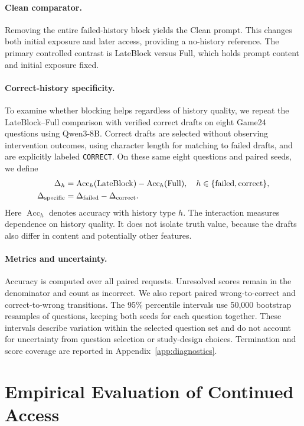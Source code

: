 \documentclass{article}
\newcommand{\fullaccess}{\ifmmode\mathrm{Full}\else\textup{Full}\fi}
\newcommand{\lateblock}{\ifmmode\mathrm{LateBlock}\else\textup{LateBlock}\fi}
\newcommand{\clean}{\ifmmode\mathrm{Clean}\else\textup{Clean}\fi}
\begin{document}
\paragraph{Clean comparator.}
Removing the entire failed-history block yields the \clean{} prompt. This changes both initial exposure and later access, providing a no-history reference. The primary controlled contrast is \lateblock{} versus \fullaccess{}, which holds prompt content and initial exposure fixed.

\paragraph{Correct-history specificity.}
To examine whether blocking helps regardless of history quality, we repeat the \lateblock{}--\fullaccess{} comparison with verified correct drafts on eight Game24 questions using Qwen3-8B. Correct drafts are selected without observing intervention outcomes, using character length for matching to failed drafts, and are explicitly labeled \texttt{CORRECT}. On these same eight questions and paired seeds, we define
\begin{align}
    \Delta_h &= \operatorname{Acc}_h(\lateblock{})-\operatorname{Acc}_h(\fullaccess{}),
    \quad h\in\{\mathrm{failed},\mathrm{correct}\}, \\
    \Delta_{\mathrm{specific}} &= \Delta_{\mathrm{failed}}-\Delta_{\mathrm{correct}}.
\end{align}
Here $\operatorname{Acc}_h$ denotes accuracy with history type $h$. The interaction measures dependence on history quality. It does not isolate truth value, because the drafts also differ in content and potentially other features.

\paragraph{Metrics and uncertainty.}

Accuracy is computed over all paired requests. Unresolved scores remain in the denominator and count as incorrect. We also report paired wrong-to-correct and correct-to-wrong transitions. The 95\% percentile intervals use 50,000 bootstrap resamples of questions, keeping both seeds for each question together. These intervals describe variation within the selected question set and do not account for uncertainty from question selection or study-design choices. Termination and score coverage are reported in Appendix~\ref{app:diagnostics}.

\section{Empirical Evaluation of Continued Access}
\label{sec:results}
\end{document}
